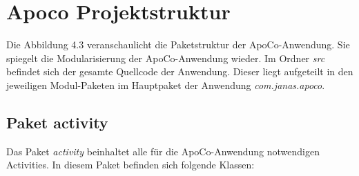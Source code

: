
\section{Apoco Projektstruktur}

Die Abbildung 4.3 veranschaulicht die Paketstruktur der ApoCo-Anwendung.
Sie spiegelt die Modularisierung der ApoCo-Anwendung wieder.
Im Ordner \emph{src} befindet sich der gesamte Quellcode der Anwendung. 
Dieser liegt aufgeteilt in den jeweiligen Modul-Paketen im Hauptpaket der Anwendung \emph{com.janas.apoco}.\\

\subsection*{Paket activity}

Das Paket \emph{activity} beinhaltet alle f\"ur die ApoCo-Anwendung notwendigen Activities.
In diesem Paket befinden sich folgende Klassen:

